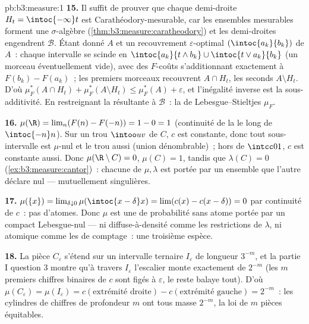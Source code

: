 \begin{solution}{pb:b3:measure:1}
\textbf{15.} Il suffit de prouver que chaque demi-droite
$H_t = \intoc{-\infty}t$ est Carathéodory-mesurable, car les
ensembles mesurables forment une $\sigma$-algèbre
(\cref{thm:b3:measure:caratheodory}) et les demi-droites
engendrent $\mathcal B$. Étant donné $A$ et un
recouvrement $\varepsilon$-optimal $(\intoc{a_k}{b_k})$ de
$A$~: chaque intervalle se scinde en $\intoc{a_k}{t\wedge
b_k} \cup \intoc{t \vee a_k}{b_k}$ (un morceau éventuellement
vide), avec des $F$-coûts s'additionnant exactement à $F(b_k)
- F(a_k)$~; les premiers morceaux recouvrent $A \cap H_t$,
les seconds $A \setminus H_t$. D'où $\mu_F^*(A\cap H_t) +
\mu_F^*(A\setminus H_t) \leq \mu_F^*(A) + \varepsilon$, et
l'inégalité inverse est la sous-additivité. En restreignant
la  résultante à $\mathcal B$~: la  de
Lebesgue--Stieltjes $\mu_F$.

\textbf{16.} $\mu(\R) = \lim_n(F(n) - F(-n)) = 1 - 0 = 1$
(continuité de la  le long de $\intoc{-n}n$). Sur un
trou $\intoo uv$ de $C$, $c$ est constante, donc tout
sous-intervalle  est $\mu$-nul et le trou aussi
(union dénombrable)~; hors de $\intcc01$, $c$ est constante
aussi. Donc $\mu(\R\setminus C) = 0$, $\mu(C) = 1$, tandis
que $\lambda(C) = 0$ (\cref{ex:b3:measure:cantor})~: chacune
de $\mu, \lambda$ est portée par un ensemble que l'autre
déclare nul --- mutuellement singulières.

\textbf{17.} $\mu(\{x\}) = \lim_{\delta\downarrow0}
\mu(\intoc{x-\delta}x) = \lim(c(x) - c(x-\delta)) = 0$ par
continuité de $c$~: pas d'atomes. Donc $\mu$ est une 
de probabilité sans atome portée par un compact
Lebesgue-nul --- ni diffuse-à-densité comme les restrictions
de $\lambda$, ni atomique comme les  de comptage~: une
troisième espèce.

\textbf{18.} La pièce $C_\varepsilon$ s'étend sur un
intervalle ternaire $I_\varepsilon$ de longueur $3^{-m}$, et
la partie I question 3 montre qu'à travers $I_\varepsilon$
l'escalier monte exactement de $2^{-m}$ (les $m$ premiers
chiffres binaires de $c$ sont figés à $\varepsilon$, le
reste balaye tout). D'où $\mu(C_\varepsilon) =
\mu(I_\varepsilon) = c(\text{extrémité droite}) -
c(\text{extrémité gauche}) = 2^{-m}$~: les cylindres de
chiffres de profondeur $m$ ont tous masse $2^{-m}$, la loi
de $m$ pièces équitables.


\end{solution}
